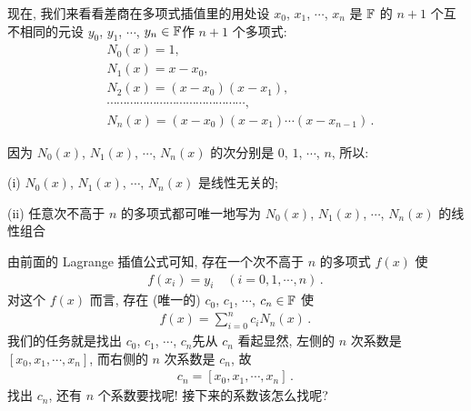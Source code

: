 现在, 我们来看看差商在多项式插值里的用处\period 设 $x_0$, $x_1$, $\cdots$, $x_{n}$ 是 $\mathbb{F}$ 的 $n+1$ 个互不相同的元\period 设 $y_0$, $y_1$, $\cdots$, $y_{n} \in \mathbb{F}$\period 作 $n+1$ 个多项式:
\begin{align*}
     & N_0 (x) = 1,                                                 \\
     & N_1 (x) = x - x_0,                                           \\
     & N_2 (x) = (x - x_0) (x - x_1),                               \\
     & \cdots \cdots \cdots \cdots \cdots \cdots \cdots
    \cdots \cdots \cdots \cdots \cdots \cdots \cdots,               \\
     & N_{n} (x) = (x - x_0) (x - x_1) \cdots (x - x_{n-1}) \period
\end{align*}

因为 $N_0 (x)$, $N_1 (x)$, $\cdots$, $N_n (x)$ 的次分别是 $0$, $1$, $\cdots$, $n$, 所以:

(i) $N_0 (x)$, $N_1 (x)$, $\cdots$, $N_n (x)$ 是线性无关的;

(ii) 任意次不高于 $n$ 的多项式都可唯一地写为 $N_0 (x)$, $N_1 (x)$, $\cdots$, $N_n (x)$ 的线性组合\period

由前面的 Lagrange 插值公式可知, 存在一个次不高于 $n$ 的多项式 $f(x)$ 使
\begin{align*}
    f(x_i) = y_i \quad (i = 0,1,\cdots,n) \period
\end{align*}
对这个 $f(x)$ 而言, 存在 (唯一的) $c_0$, $c_1$, $\cdots$, $c_n \in \mathbb{F}$ 使
\begin{align*}
    f(x) = \sum_{i = 0}^{n} c_i N_{n} (x) \period
\end{align*}
我们的任务就是找出 $c_0$, $c_1$, $\cdots$, $c_n$\period 先从 $c_n$ 看起\period 显然, 左侧的 $n$ 次系数是 $[x_0, x_1, \cdots, x_n]$, 而右侧的 $n$ 次系数是 $c_n$, 故
\begin{align*}
    c_n = [x_0, x_1, \cdots, x_n] \period
\end{align*}
找出 $c_n$, 还有 $n$ 个系数要找呢! 接下来的系数该怎么找呢?

